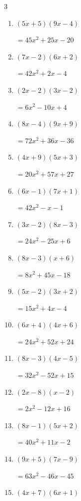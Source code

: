 \begin{multicols}{3}
\begin{enumerate}
        $=32x^{2}+44x+15$

\columnbreak %

\resetques

  \item $(5x+5)(9x-4)$

        $=45x^{2}+25x-20$

  \item $(7x-2)(6x+2)$

        $=42x^{2}+2x-4$

  \item $(2x-2)(3x-2)$

        $=6x^{2}-10x+4$

  \item $(8x-4)(9x+9)$

        $=72x^{2}+36x-36$

  \item $(4x+9)(5x+3)$

        $=20x^{2}+57x+27$

  \item $(6x-1)(7x+1)$

        $=42x^{2}-x-1$

  \item $(3x-2)(8x-3)$

        $=24x^{2}-25x+6$

  \item $(8x-3)(x+6)$

        $=8x^{2}+45x-18$

  \item $(5x-2)(3x+2)$

        $=15x^{2}+4x-4$

  \item $(6x+4)(4x+6)$

        $=24x^{2}+52x+24$

  \item $(8x-3)(4x-5)$

        $=32x^{2}-52x+15$

  \item $(2x-8)(x-2)$

        $=2x^{2}-12x+16$

  \item $(8x-1)(5x+2)$

        $=40x^{2}+11x-2$

  \item $(9x+5)(7x-9)$

        $=63x^{2}-46x-45$

  \item $(4x+7)(6x+1)$


\end{enumerate}
\end{multicols}
